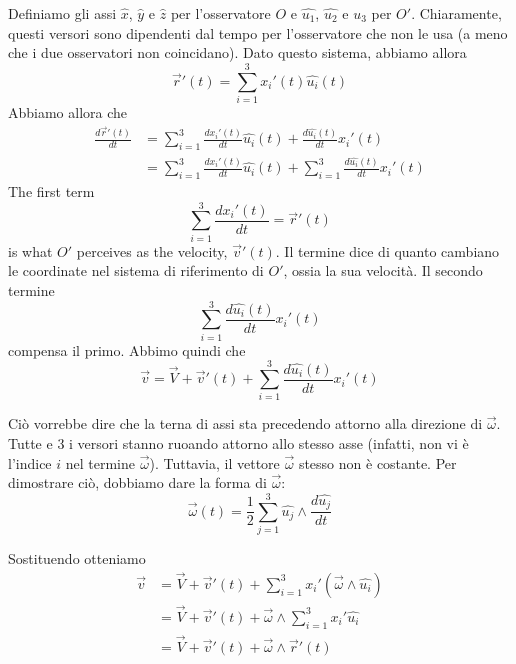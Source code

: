 \documentclass[a4paper]{article}
\begin{document}
Definiamo gli assi \(\hat{x}\), \(\hat{y}\) e \(\hat{z}\) per l'osservatore \(O\)
e \(\hat{u_1}\), \(\hat{u_2}\) e \(\hat{u_3}\) per \(O'\).
Chiaramente, questi versori sono dipendenti dal tempo per l'osservatore che non le usa (a meno
che i due osservatori non coincidano).
Dato questo sistema, abbiamo allora
\[
    \vec{r}'(t) = \sum_{i=1}^3 x_i'(t)\hat{u_i}(t)
\]
Abbiamo allora che
\begin{align*}
    \frac{d\vec{r}'(t)}{dt} &= \sum_{i=1}^3 \frac{dx_i'(t)}{dt} \hat{u_i}(t)
    + \frac{d\hat{u_i}(t)}{dt} x_i'(t) \\
    &= \sum_{i=1}^3 \frac{dx_i'(t)}{dt} \hat{u_i}(t)
    + \sum_{i=1}^3 \frac{d\hat{u_i}(t)}{dt} x_i'(t)
\end{align*}
The first term
\[
    \sum_{i=1}^3 \frac{dx_i'(t)}{dt} = \vec{r}'(t)
\]
is what \(O'\) perceives as the velocity, \(\vec{v}'(t)\).
Il termine dice di quanto cambiano le coordinate nel sistema di riferimento di \(O'\),
ossia la sua velocità.
Il secondo termine
\[
    \sum_{i=1}^3 \frac{d\hat{u_i}(t)}{dt} x_i'(t)
\]
compensa il primo.
Abbimo quindi che
\[
    \vec{v} = \vec{V} + \vec{v}'(t) + \sum_{i=1}^3 \frac{d\hat{u_i}(t)}{dt} x_i'(t)
\]


Ciò vorrebbe dire che la terna di assi sta precedendo attorno alla direzione di \(\vec{\omega}\).
Tutte e 3 i versori stanno ruoando attorno allo stesso asse (infatti, non vi è l'indice \(i\) nel termine
\(\vec{\omega}\)). Tuttavia, il vettore \(\vec{\omega}\) stesso non è costante.
Per dimostrare ciò, dobbiamo dare la forma di \(\vec{\omega}\):
\[
    \vec{\omega}(t) = \frac{1}{2} \sum_{j=1}^3 \hat{u_j} \wedge \frac{d \hat{u_j}}{dt}
\]

Sostituendo otteniamo
\begin{align*}
    \vec{v} &= \vec{V} + \vec{v}'(t) + \sum_{i=1}^3 x_i'(\vec{\omega} \wedge \hat{u_i}) \\
    &= \vec{V} + \vec{v}'(t) + \vec{\omega} \wedge \sum_{i=1}^3 x_i'\hat{u_i} \\
    &= \vec{V} + \vec{v}'(t) + \vec{\omega} \wedge \vec{r}'(t)
\end{align*}
\end{document}
